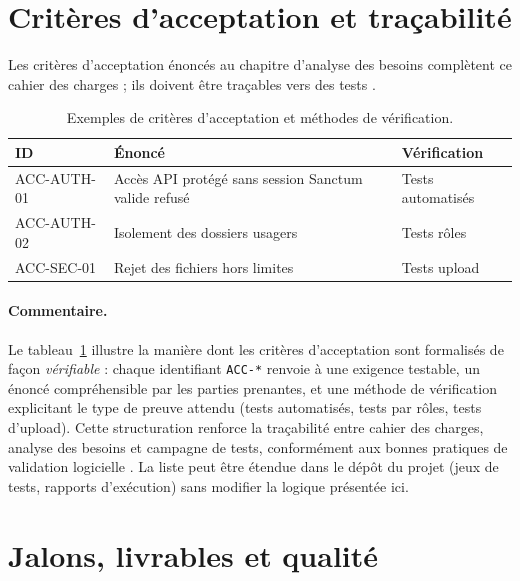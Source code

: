 \section{Critères d'acceptation et traçabilité}

Les critères d'acceptation énoncés au chapitre d'analyse des besoins complètent ce cahier des charges ; ils doivent être traçables vers des tests \cite{ieee1012}.

\begin{table}[htbp]
  \centering
  \renewcommand{\arraystretch}{1.4}
  \setlength{\tabcolsep}{10pt}
  \caption{Exemples de critères d'acceptation et méthodes de vérification.}
  \label{tab:criteria}
  \begin{tabular}{|p{2.6cm}|p{5.3cm}|p{4.7cm}|}
    \hline
    \textbf{ID} & \textbf{Énoncé} & \textbf{Vérification} \\
    \hline
    ACC-AUTH-01 & Accès API protégé sans session Sanctum valide refusé & Tests automatisés \\
    \hline
    ACC-AUTH-02 & Isolement des dossiers usagers & Tests rôles \\
    \hline
    ACC-SEC-01 & Rejet des fichiers hors limites & Tests upload \\
    \hline
  \end{tabular}
\end{table}

\paragraph{Commentaire.}
Le tableau~\ref{tab:criteria} illustre la manière dont les critères d'acceptation sont formalisés de façon \emph{vérifiable} : chaque identifiant \texttt{ACC-*} renvoie à une exigence testable, un énoncé compréhensible par les parties prenantes, et une méthode de vérification explicitant le type de preuve attendu (tests automatisés, tests par rôles, tests d'upload). Cette structuration renforce la traçabilité entre cahier des charges, analyse des besoins et campagne de tests, conformément aux bonnes pratiques de validation logicielle \cite{ieee1012,sommerville2016}. La liste peut être étendue dans le dépôt du projet (jeux de tests, rapports d'exécution) sans modifier la logique présentée ici.

\newpage
\section{Jalons, livrables et qualité}

